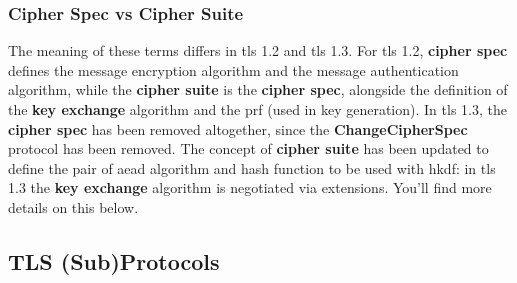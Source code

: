 \documentclass{llncs}
\begin{document}
\subsubsection{Cipher Spec vs Cipher Suite}

The meaning of these terms differs in \gls{tls} 1.2 and \gls{tls} 1.3. For \gls{tls} 1.2,
\textbf{cipher spec} defines the message encryption algorithm and the message
authentication algorithm, while the \textbf{cipher suite} is the \textbf{cipher spec},
alongside the definition of the \textbf{key exchange} algorithm and the \gls{prf} (used in key generation). In \gls{tls} 1.3, the
 \textbf{cipher spec} has been removed altogether, since the  \textbf{ChangeCipherSpec}
 protocol has been removed. The concept of \textbf{cipher suite} has been updated
 to define the pair of \gls{aead} algorithm and hash function to be used with
 \gls{hkdf}: in \gls{tls} 1.3 the  \textbf{key exchange} algorithm is negotiated via
 extensions. You'll find more details on this below.

\subsection{TLS (Sub)Protocols}
\end{document}
